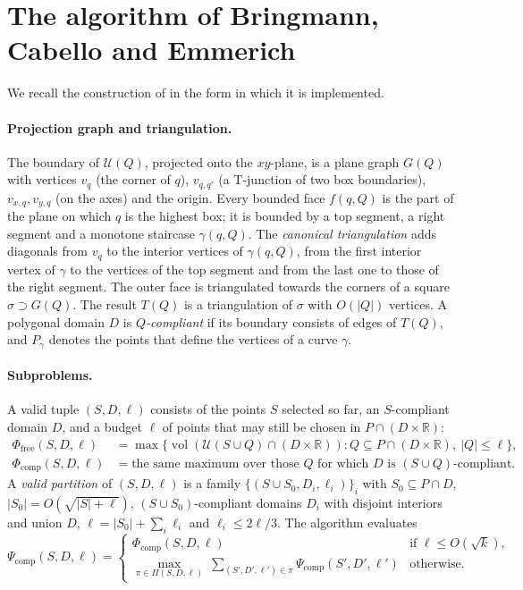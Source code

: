 \documentclass[12pt,a4paper]{article}
\newcommand{\vol}{\operatorname{vol}}
\newcommand{\U}{\mathcal{U}}
\newcommand{\R}{\mathbb{R}}
\newcommand{\Pfree}{\Phi_{\mathrm{free}}}
\newcommand{\Pcomp}{\Phi_{\mathrm{comp}}}
\newcommand{\Psic}{\Psi_{\mathrm{comp}}}
\begin{document}
\section{The algorithm of Bringmann, Cabello and Emmerich}
\label{sec:alg}
We recall the construction of \cite[Section~4]{BCE} in the form in which it is implemented.

\paragraph{Projection graph and triangulation.}
The boundary of $\U(Q)$, projected onto the $xy$-plane, is a plane graph $G(Q)$ with
vertices $v_q$ (the corner of $q$), $v_{q,q'}$ (a T-junction of two box boundaries),
$v_{x,q},v_{y,q}$ (on the axes) and the origin.  Every bounded face $f(q,Q)$ is the part
of the plane on which $q$ is the highest box; it is bounded by a top segment, a right
segment and a monotone staircase $\gamma(q,Q)$.  The \emph{canonical triangulation}
adds diagonals from $v_q$ to the interior vertices of $\gamma(q,Q)$, from the first interior
vertex of $\gamma$ to the vertices of the top segment and from the last one to those of the
right segment.  The outer face is triangulated towards the corners of a square
$\sigma\supset G(Q)$.  The result $T(Q)$ is a triangulation of $\sigma$ with $O(|Q|)$
vertices.  A polygonal domain $D$ is \emph{$Q$-compliant} if its boundary consists of edges
of $T(Q)$, and $P_\gamma$ denotes the points that define the vertices of a curve $\gamma$.

\paragraph{Subproblems.}
A valid tuple $(S,D,\ell)$ consists of the points $S$ selected so far, an $S$-compliant
domain $D$, and a budget $\ell$ of points that may still be chosen in $P\cap(D\times\R)$:
\begin{align*}
 \Pfree(S,D,\ell) &=\max\{\vol(\U(S\cup Q)\cap(D\times\R)) : Q\subseteq P\cap(D\times\R),\ |Q|\le\ell\},\\
 \Pcomp(S,D,\ell) &=\text{the same maximum over those $Q$ for which $D$ is $(S\cup Q)$-compliant.}
\end{align*}
A \emph{valid partition} of $(S,D,\ell)$ is a family $\{(S\cup S_0,D_i,\ell_i)\}_i$ with
$S_0\subseteq P\cap D$, $|S_0|=O(\sqrt{|S|+\ell})$, $(S\cup S_0)$-compliant domains $D_i$
with disjoint interiors and union $D$, $\ell=|S_0|+\sum_i\ell_i$ and $\ell_i\le 2\ell/3$.
The algorithm evaluates
\begin{equation}\label{eq:psi}
 \Psic(S,D,\ell)=
 \begin{cases}
   \Pcomp(S,D,\ell) & \text{if }\ell\le O(\sqrt{k}),\\[0.5ex]
   \displaystyle\max_{\pi\in\Pi(S,D,\ell)}\ \sum_{(S',D',\ell')\in\pi}\Psic(S',D',\ell') & \text{otherwise.}
 \end{cases}
\end{equation}
\end{document}
